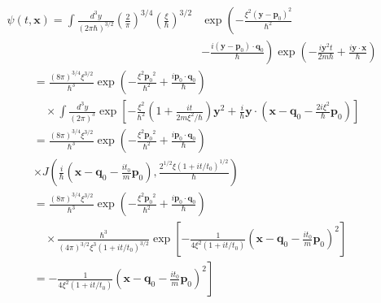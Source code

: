 \documentclass{article}
\begin{document}
$$
\begin{align*}
\psi(t, \boldsymbol{x})=\int \frac{d^{3} y}{(2 \pi \hbar)^{3 / 2}}\left(\frac{2}{\pi}\right)^{3 / 4}\left(\frac{\xi}{\hbar}\right)^{3 / 2} & \exp \left(-\frac{\xi^{2}\left(\boldsymbol{y}-\boldsymbol{p}_{0}\right)^{2}}{\hbar^{2}}\right.  \tag{3.19.19}\\
& \left.-\frac{i\left(\boldsymbol{y}-\boldsymbol{p}_{0}\right) \cdot \boldsymbol{q}_{0}}{\hbar}\right) \exp \left(-\frac{i \boldsymbol{y}^{2} t}{2 m \hbar}+\frac{i \boldsymbol{y} \cdot \boldsymbol{x}}{\hbar}\right)
\end{align*}
$$
$$
\begin{aligned}
&= \frac{(8 \pi)^{3 / 4} \xi^{3 / 2}}{\hbar^{3}} \exp \left(-\frac{\xi^{2} \boldsymbol{p}_{0}{ }^{2}}{\hbar^{2}}+\frac{i \boldsymbol{p}_{0} \cdot \boldsymbol{q}_{0}}{\hbar}\right) \\
& \quad \times \int \frac{d^{3} y}{(2 \pi)^{3}} \exp \left[-\frac{\xi^{2}}{\hbar^{2}}\left(1+\frac{i t}{2 m \xi^{2} / \hbar}\right) \boldsymbol{y}^{2}+\frac{i}{\hbar} \boldsymbol{y} \cdot\left(\boldsymbol{x}-\boldsymbol{q}_{0}-\frac{2 i \xi^{2}}{\hbar} \boldsymbol{p}_{0}\right)\right] \\
&=\frac{(8 \pi)^{3 / 4} \xi^{3 / 2}}{\hbar^{3}} \exp \left(-\frac{\xi^{2} \boldsymbol{p}_{0}{ }^{2}}{\hbar^{2}}+\frac{i \boldsymbol{p}_{0} \cdot \boldsymbol{q}_{0}}{\hbar}\right) \\
& \times J\left(\frac{i}{\hbar}\left(\boldsymbol{x}-\boldsymbol{q}_{0}-\frac{i t_{0}}{m} \boldsymbol{p}_{0}\right), \frac{2^{1 / 2} \xi\left(1+i t / t_{0}\right)^{1 / 2}}{\hbar}\right) \\
&=\frac{(8 \pi)^{3 / 4} \xi^{3 / 2}}{\hbar^{3}} \exp \left(-\frac{\xi^{2} \boldsymbol{p}_{0}{ }^{2}}{\hbar^{2}}+\frac{i \boldsymbol{p}_{0} \cdot \boldsymbol{q}_{0}}{\hbar}\right) \\
& \quad \times \frac{\hbar^{3}}{(4 \pi)^{3 / 2} \xi^{3}\left(1+i t / t_{0}\right)^{3 / 2}} \exp \left[-\frac{1}{4 \xi^{2}\left(1+i t / t_{0}\right)}\left(\boldsymbol{x}-\boldsymbol{q}_{0}-\frac{i t_{0}}{m} \boldsymbol{p}_{0}\right)^{2}\right] \\
&=\left.-\frac{1}{4 \xi^{2}\left(1+i t / t_{0}\right)}\left(\boldsymbol{x}-\boldsymbol{q}_{0}-\frac{i t_{0}}{m} \boldsymbol{p}_{0}\right)^{2}\right]
\end{aligned}
$$
\end{document}
